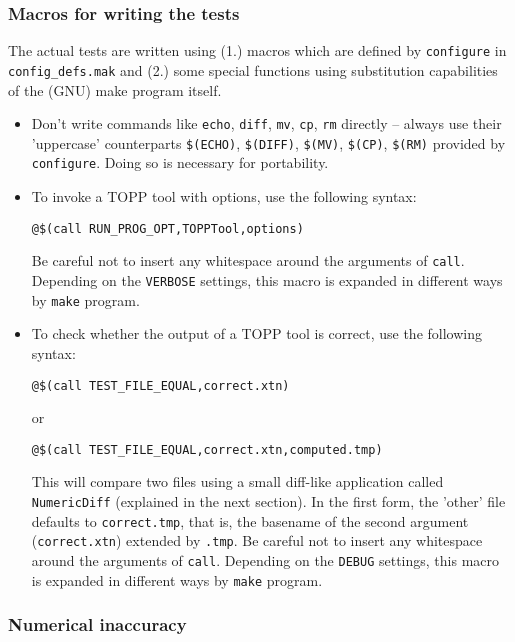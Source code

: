 \documentclass[a4]{article}
\begin{document}
\subsubsection{Macros for writing the tests}

The actual tests are written using (1.) macros which are defined by
\texttt{configure} in \texttt{config\_defs.mak} and (2.) some special
functions using substitution capabilities of the (GNU) make program itself.
\begin{itemize}
 \item Don't write commands like \texttt{echo}, \texttt{diff}, \texttt{mv},
  \texttt{cp}, \texttt{rm} directly -- always use their 'uppercase'
  counterparts \texttt{\$(ECHO)}, \texttt{\$(DIFF)}, \texttt{\$(MV)},
  \texttt{\$(CP)}, \texttt{\$(RM)} provided by \texttt{configure}.  Doing so is
  necessary for portability.

 \item To invoke a TOPP tool with options, use the following syntax:

  \texttt{@\$(call RUN\_PROG\_OPT,TOPPTool,options)}

  Be careful not to insert any whitespace around the arguments of
  \texttt{call}.  Depending on the \texttt{VERBOSE} settings, this macro is
  expanded in different ways by \texttt{make} program.

 \item To check whether the output of a TOPP tool is correct, use the following syntax:

  \texttt{@\$(call TEST\_FILE\_EQUAL,correct.xtn)}
  
  or 

  \texttt{@\$(call TEST\_FILE\_EQUAL,correct.xtn,computed.tmp)}
  
  This will compare two files using a small diff-like application called
  \texttt{NumericDiff} (explained in the next section).  In the first form,
  the 'other' file defaults to \texttt{correct.tmp}, that is, the basename of
  the second argument (\texttt{correct.xtn}) extended by \texttt{.tmp}.  Be
  careful not to insert any whitespace around the arguments of \texttt{call}.
  Depending on the \texttt{DEBUG} settings, this macro is expanded in
  different ways by \texttt{make} program.
  
\end{itemize}

\subsubsection{Numerical inaccuracy}
\end{document}
